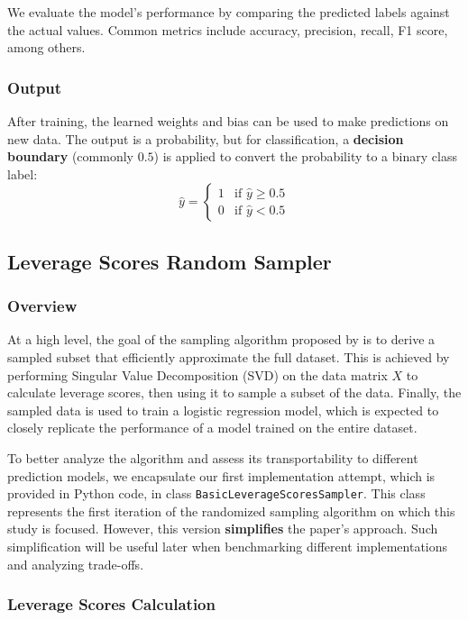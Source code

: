 \documentclass{article}
\theoremstyle{plain}
\theoremstyle{definition}
\theoremstyle{remark}
\begin{document}
We evaluate the model’s performance by comparing the predicted labels against the actual values. Common metrics include accuracy, precision, recall, F1 score, among others.


\subsubsection{Output}

After training, the learned weights and bias can be used to make predictions on new data. The output is a probability, but for classification, a \textbf{decision boundary} (commonly $0.5$) is applied to convert the probability to a binary class label:
$$
\hat{y} = \begin{cases}
1 & \text{if } \hat{y} \geq 0.5 \\
0 & \text{if } \hat{y} < 0.5
\end{cases}
$$


\subsection{Leverage Scores Random Sampler}

\subsubsection{Overview}

At a high level, the goal of the sampling algorithm proposed by \citeauthor{chow24} is to derive a sampled subset that efficiently approximate the full dataset. This is achieved by performing Singular Value Decomposition (SVD) on the data matrix $X$ to calculate leverage scores, then using it to sample a subset of the data. Finally, the sampled data is used to train a logistic regression model, which is expected to closely replicate the performance of a model trained on the entire dataset.

To better analyze the algorithm and assess its transportability to different prediction models, we encapsulate our first implementation attempt, which is provided in Python code, in class \texttt{BasicLeverageScoresSampler}. This class represents the first iteration of the randomized sampling algorithm on which this study is focused. However, this version \textbf{simplifies} the paper's approach. Such simplification will be useful later when benchmarking different implementations and analyzing trade-offs.


\subsubsection{Leverage Scores Calculation}
\end{document}
